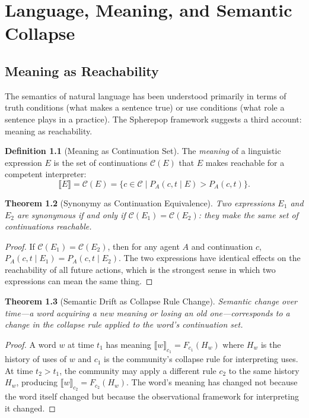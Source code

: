 \documentclass[12pt, a4paper, openany]{book}
\theoremstyle{plain}
\newtheorem{theorem}{Theorem}[chapter]
\theoremstyle{definition}
\newtheorem{definition}[theorem]{Definition}
\theoremstyle{remark}
\newcommand{\calC}{\mathcal{C}}
\begin{document}
\chapter{Language, Meaning, and Semantic Collapse}

\section{Meaning as Reachability}

The semantics of natural language has been understood primarily in terms of
truth conditions (what makes a sentence true) or use conditions (what role
a sentence plays in a practice). The Spherepop framework suggests a third
account: meaning as reachability.

\begin{definition}[Meaning as Continuation Set]
The \emph{meaning} of a linguistic expression $E$ is the set of continuations
$\calC(E)$ that $E$ makes reachable for a competent interpreter:
\[
\llbracket E \rrbracket = \calC(E) = \{c \in \calC \mid P_A(c, t \mid E) > P_A(c, t)\}.
\]
\end{definition}

\begin{theorem}[Synonymy as Continuation Equivalence]
Two expressions $E_1$ and $E_2$ are synonymous if and only if
$\calC(E_1) = \calC(E_2)$: they make the same set of continuations reachable.
\end{theorem}

\begin{proof}
If $\calC(E_1) = \calC(E_2)$, then for any agent $A$ and continuation $c$,
$P_A(c, t \mid E_1) = P_A(c, t \mid E_2)$. The two expressions have identical
effects on the reachability of all future actions, which is the strongest sense
in which two expressions can mean the same thing.
\end{proof}

\begin{theorem}[Semantic Drift as Collapse Rule Change]
Semantic change over time---a word acquiring a new meaning or losing an old
one---corresponds to a change in the collapse rule applied to the word's
continuation set.
\end{theorem}

\begin{proof}
A word $w$ at time $t_1$ has meaning $\llbracket w \rrbracket_{c_1} = F_{c_1}(H_w)$
where $H_w$ is the history of uses of $w$ and $c_1$ is the community's collapse
rule for interpreting uses. At time $t_2 > t_1$, the community may apply a
different rule $c_2$ to the same history $H_w$, producing
$\llbracket w \rrbracket_{c_2} = F_{c_2}(H_w)$. The word's meaning has changed
not because the word itself changed but because the observational framework for
interpreting it changed.
\end{proof}
\end{document}
